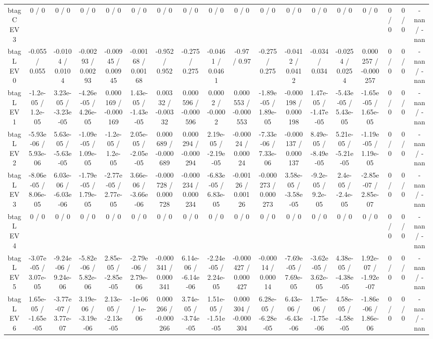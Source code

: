 \documentclass[10pt]{article}
\begin{document}
\begin{table}[htbp]
\begin{center}
\begin{tabular}{|c|c|c|c|c|c|c|c|c|c|c|c|c|c|c|c|c|c|}
  btag C EV 3 & 0 / 0 & 0 / 0 & 0 / 0 & 0 / 0 & 0 / 0 & 0 / 0 & 0 / 0 & 0 / 0 & 0 / 0 & 0 / 0 & 0 / 0 & 0 / 0 & 0 / 0 & 0 / 0 & 0 / 0 & 0 / 0 & -nan / -nan \\ 
  btag L EV 0 & -0.055 / 0.055 & -0.0104 / 0.0104 & -0.00293 / 0.00293 & -0.00945 / 0.00945 & -0.00168 / 0.00168 & -0.952 / 0.952 & -0.275 / 0.275 & -0.0461 / 0.0461 & -0.97 / 0.97 & -0.275 / 0.275 & -0.0412 / 0.0412 & -0.034 / 0.034 & -0.0254 / 0.0254 & 0.000257 / -0.000257 & 0 / 0 & 0 / 0 & -nan / -nan \\ 
  btag L EV 1 & -1.2e-05 / 1.2e-05 & 3.23e-05 / -3.23e-05 & -4.26e-05 / 4.26e-05 & 0.000169 / -0.000169 & 1.43e-05 / -1.43e-05 & 0.00332 / -0.00332 & 0.000596 / -0.000596 & 0.0002 / -0.0002 & 0.000553 / -0.000553 & -1.89e-05 / 1.89e-05 & -0.000198 / 0.000198 & 1.47e-05 / -1.47e-05 & -5.43e-05 / 5.43e-05 & -1.65e-05 / 1.65e-05 & 0 / 0 & 0 / 0 & -nan / -nan \\ 
  btag L EV 2 & -5.93e-06 / 5.93e-06 & 5.63e-05 / -5.63e-05 & -1.09e-05 / 1.09e-05 & -1.2e-05 / 1.2e-05 & 2.05e-05 / -2.05e-05 & 0.000689 / -0.000689 & 0.000294 / -0.000294 & 2.19e-05 / -2.19e-05 & -0.00024 / 0.00024 & -7.33e-06 / 7.33e-06 & -0.000137 / 0.000137 & 8.49e-05 / -8.49e-05 & 5.21e-05 / -5.21e-05 & -1.19e-05 / 1.19e-05 & 0 / 0 & 0 / 0 & -nan / -nan \\ 
  btag L EV 3 & -8.06e-05 / 8.06e-05 & 6.03e-06 / -6.03e-06 & -1.79e-05 / 1.79e-05 & -2.77e-05 / 2.77e-05 & 3.66e-06 / -3.66e-06 & -0.000728 / 0.000728 & -0.000234 / 0.000234 & -6.83e-05 / 6.83e-05 & -0.00126 / 0.00126 & -0.000273 / 0.000273 & 3.58e-05 / -3.58e-05 & -9.2e-05 / 9.2e-05 & 2.4e-05 / -2.4e-05 & -2.85e-07 / 2.85e-07 & 0 / 0 & 0 / 0 & -nan / -nan \\ 
  btag L EV 4 & 0 / 0 & 0 / 0 & 0 / 0 & 0 / 0 & 0 / 0 & 0 / 0 & 0 / 0 & 0 / 0 & 0 / 0 & 0 / 0 & 0 / 0 & 0 / 0 & 0 / 0 & 0 / 0 & 0 / 0 & 0 / 0 & -nan / -nan \\ 
  btag L EV 5 & -3.07e-05 / 3.07e-05 & -9.24e-06 / 9.24e-06 & -5.82e-06 / 5.82e-06 & 2.85e-05 / -2.85e-05 & -2.79e-06 / 2.79e-06 & -0.000341 / 0.000341 & 6.14e-06 / -6.14e-06 & -2.24e-05 / 2.24e-05 & -0.000427 / 0.000427 & -0.00014 / 0.00014 & -7.69e-05 / 7.69e-05 & -3.62e-05 / 3.62e-05 & 4.38e-05 / -4.38e-05 & 1.92e-07 / -1.92e-07 & 0 / 0 & 0 / 0 & -nan / -nan \\ 
  btag L EV 6 & 1.65e-05 / -1.65e-05 & -3.77e-07 / 3.77e-07 & 3.19e-06 / -3.19e-06 & 2.13e-05 / -2.13e-05 & -1e-06 / 1e-06 & 0.000266 / -0.000266 & 3.74e-05 / -3.74e-05 & 1.51e-05 / -1.51e-05 & 0.000304 / -0.000304 & 6.28e-05 / -6.28e-05 & 6.43e-06 / -6.43e-06 & 1.75e-06 / -1.75e-06 & 4.58e-05 / -4.58e-05 & -1.86e-06 / 1.86e-06 & 0 / 0 & 0 / 0 & -nan / -nan \\ 

\end{tabular}
\end{center}
\end{table}
\end{document}
